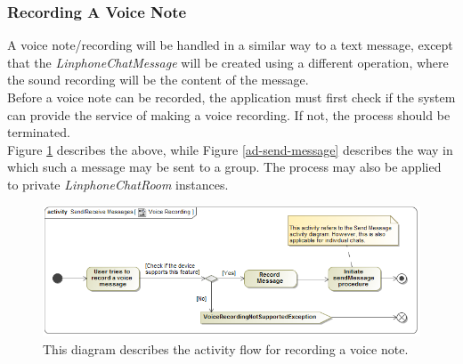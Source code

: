 \documentclass[11pt]{article}
\begin{document}
\subsubsection{Recording A Voice Note}
A voice note/recording will be handled in a similar way to a text message, except that the \textit{LinphoneChatMessage} will be created using a different operation, where the sound recording will be the content of the message.\\
Before a voice note can be recorded, the application must first check if the system can provide the service of making a voice recording. If not, the process should be terminated.\\
Figure \ref{ad-voice-record} describes the above, while Figure \ref{ad-send-message} describes the way in which such a message may be sent to a group. The process may also be applied to private \textit{LinphoneChatRoom} instances.
\begin{figure}[H]
\centering
\includegraphics[width=5in]{./images/activity_voice_record.png}
\caption[Voice Recording Activity Diagram]{This diagram describes the activity flow for recording a voice note.}
\label{ad-voice-record}
\end{figure}
\end{document}
